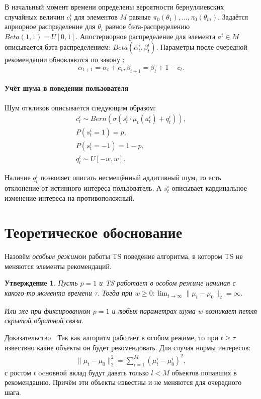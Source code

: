 \documentclass[12pt, twoside]{article}
\newtheorem{statement}{Утверждение}
\begin{document}
В начальный момент времени определены вероятности бернуллиевских случайных величин $c_t^i$ для элементов $M$ равные $\pi_0(\theta_1), \dots, \pi_0(\theta_m)$. 
Задаётся априорное распределение для $\theta_i$ равное бэта-распределению $Beta(1, 1) = U[0, 1]$. 
Апостериорное распределение для элемента $a^i \in M$ описывается бэта-распределением: $Beta(\alpha_t^i, \beta_t^i)$. 
Параметры после очередной рекомендации обновляются по закону :
\begin{equation}\label{eq3}
\alpha_{t+1} = \alpha_t + c_t, \beta_{t+1} = \beta_t + 1 - c_t.
\end{equation}

\paragraph{Учёт шума в поведении пользователя}
Шум откликов описываeтся следующим образом: 
\begin{gather*}
  c_t^i \sim Bern \left(\sigma(s_t^i \cdot \mu_t(a_t^i) + q_t^i) \right), \\
  P(s_t^i = 1) = p, \\ P(s_t^i = -1) = 1 - p, \\
  q_t^i \sim U[-w, w].
\end{gather*}

Наличие $q_t^i$ позволяет описать несмещённый аддитивный шум, то есть отклонение от истинного интереса пользователь. А $s_t^i$ описывает кардинальное изменение интереса на противоположный. 


\section{Теоретическое обоснование}
Назовём \textit{особым режимом} работы TS поведение алгоритма, в котором TS не меняются элементы рекомендаций.

\begin{statement}
  Пусть  $p=1$ и TS работает в особом режиме начиная с какого-то момента времени $\tau$. Тогда при $w \geq 0 : \lim_{t \to \infty} \|\mu_t - \mu_0 \|_2 = \infty.$

  Или же при фиксированном $ p = 1$ и любых параметрах шума $w$ возникает петля скрытой обратной связи. 
\end{statement}
$\textbf{Доказательство. }$ 
Так как алгоритм работает в особом режиме, то при $t \geq \tau$ извествно какие объекты он будет рекомендовать.
Для случая нормы интересов: 
\begin{gather*}
  \|\mu_t - \mu_0 \|^2_2 = \sum_{i=1}^M (\mu_t^i - \mu_0^i)^2,
\end{gather*}
с ростом $t$ ocновной вклад будут давать только $l < M$ объектов попавших в рекомендацию. 
Причём эти объекты известны и не меняются для очередного шага. 
\end{document}
